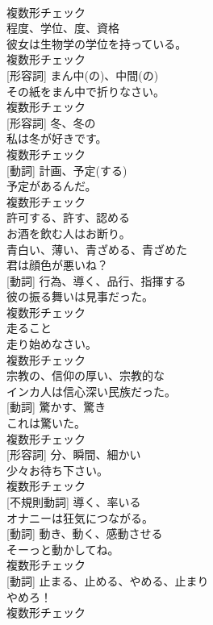 \documentclass[8pt]{extreport}
\begin{document}
\begin{CJK}{UTF8}{min}
\\	複数形チェック
\\	[名詞]	程度、学位、度、資格	
\\	彼女は生物学の学位を持っている。	
\\	複数形チェック
\\	[名詞] [形容詞]	まん中(の)、中間(の)	
\\	その紙をまん中で折りなさい。	
\\	複数形チェック
\\	[名詞] [形容詞]	冬、冬の	
\\	私は冬が好きです。	
\\	複数形チェック
\\	[名詞] [動詞]	計画、予定(する)	
\\	予定があるんだ。	
\\	複数形チェック
\\	[動詞]	許可する、許す、認める	
\\	お酒を飲む人はお断り。	
\\	[形容詞]	青白い、薄い、青ざめる、⻘ざめた	
\\	君は顔色が悪いね？	
\\	[名詞] [動詞]	行為、導く、品行、指揮する	
\\	彼の振る舞いは見事だった。	
\\	複数形チェック
\\	[名詞]	走ること	
\\	走り始めなさい。	
\\	複数形チェック
\\	[形容詞]	宗教の、信仰の厚い、宗教的な	
\\	インカ人は信心深い民族だった。	
\\	[名詞] [動詞]	驚かす、驚き	
\\	これは驚いた。	
\\	複数形チェック
\\	[名詞] [形容詞]	分、瞬間、細かい
\\	少々お待ち下さい。	
\\	複数形チェック
\\	[動詞] [不規則動詞]	導く、率いる	
\\	オナニーは狂気につながる。	
\\	[名詞] [動詞]	動き、動く、感動させる	
\\	そーっと動かしてね。	
\\	複数形チェック
\\	[名詞] [動詞]	止まる、止める、やめる、止まり	
\\	やめろ！	
\\	複数形チェック

\end{CJK}
\end{document}
